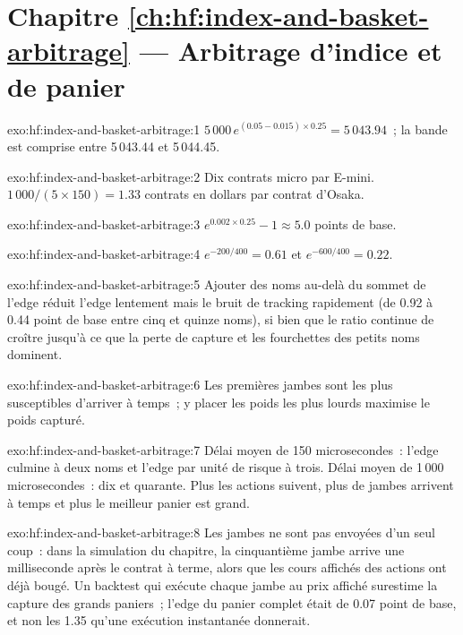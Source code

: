 \section*{Chapitre \ref{ch:hf:index-and-basket-arbitrage} --- Arbitrage d'indice et de panier}

\begin{solution}{exo:hf:index-and-basket-arbitrage:1}
$5\,000\,e^{(0.05-0.015)\times0.25}=5\,043.94$~; la bande est comprise entre 5\,043.44 et 5\,044.45.
\end{solution}

\begin{solution}{exo:hf:index-and-basket-arbitrage:2}
Dix contrats micro par E-mini. $1\,000/(5\times150)=1.33$ contrats en dollars par contrat d'Osaka.
\end{solution}

\begin{solution}{exo:hf:index-and-basket-arbitrage:3}
$e^{0.002\times0.25}-1\approx5.0$ points de base.
\end{solution}

\begin{solution}{exo:hf:index-and-basket-arbitrage:4}
$e^{-200/400}=0.61$ et $e^{-600/400}=0.22$.
\end{solution}

\begin{solution}{exo:hf:index-and-basket-arbitrage:5}
Ajouter des noms au-delà du sommet de l'edge réduit l'edge lentement mais le bruit de tracking rapidement (de 0.92 à 0.44 point de base entre cinq et quinze
noms), si bien que le ratio continue de croître jusqu'à ce que la perte de capture et les fourchettes des petits noms dominent.
\end{solution}

\begin{solution}{exo:hf:index-and-basket-arbitrage:6}
Les premières jambes sont les plus susceptibles d'arriver à temps~; y placer les poids les plus lourds maximise le poids capturé.
\end{solution}

\begin{solution}{exo:hf:index-and-basket-arbitrage:7}
Délai moyen de 150 microsecondes~: l'edge culmine à deux noms et l'edge par unité de risque à trois. Délai moyen de 1\,000 microsecondes~: dix et quarante. Plus les
actions suivent, plus de jambes arrivent à temps et plus le meilleur panier est grand.
\end{solution}

\begin{solution}{exo:hf:index-and-basket-arbitrage:8}
Les jambes ne sont pas envoyées d'un seul coup~: dans la simulation du chapitre, la cinquantième jambe arrive une milliseconde après le contrat à terme, alors que les cours affichés des actions ont
déjà bougé. Un backtest qui exécute chaque jambe au prix affiché surestime la capture des grands paniers~; l'edge du panier complet était de 0.07
point de base, et non les 1.35 qu'une exécution instantanée donnerait.
\end{solution}

